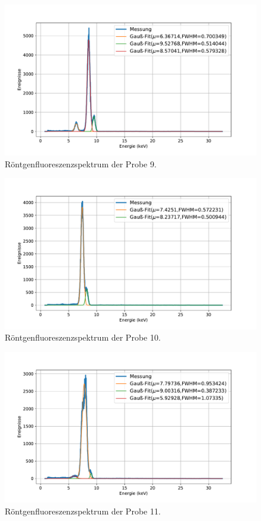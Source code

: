 \documentclass[
	a4paper,
	12pt,
	pagesize,
	ngerman
]{scrartcl}
\begin{document}
	\begin{figure}[H]
		\includegraphics[width=\textwidth]{images/9-X.pdf}
		\centering
		\caption{Röntgenfluoreszenzspektrum der Probe 9.}
	\end{figure}

	\begin{figure}[H]
		\includegraphics[width=\textwidth]{images/10-X.pdf}
		\centering
		\caption{Röntgenfluoreszenzspektrum der Probe 10.}
	\end{figure}

	\begin{figure}[H]
		\includegraphics[width=\textwidth]{images/11-X.pdf}
		\centering
		\caption{Röntgenfluoreszenzspektrum der Probe 11.}
	\end{figure}
\end{document}
